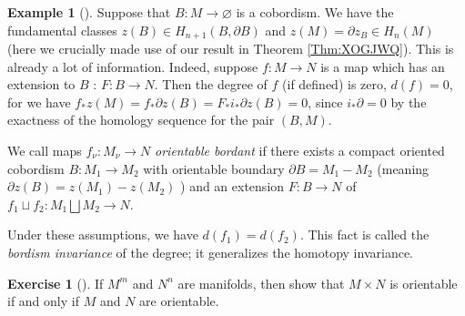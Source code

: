 \documentclass[reqno]{amsart}
\theoremstyle{definition}
\newtheorem{example}[theorem]{Example}
\newtheorem{exercise}[theorem]{Exercise}
\theoremstyle{remark}
\begin{document}
\begin{example}[]
    Suppose that
    $B \colon M \to \varnothing$ is a cobordism.
    We have the fundamental classes
    $z(B) \in H_{n+1}(B, \partial B)$ and
    $z(M) = \partial z_{B} \in 
    H_n (M)$ (here we crucially made use of our result
    in Theorem \ref{Thm:XOGJWQ}). This is already a lot of
    information. Indeed, suppose $f \colon M \to N$ is a 
    map which has an extension to $B$ : $F\colon B \to N$.
    Then the degree of $f$ (if defined) is zero,
    $d(f) = 0$, for we have
    $f_* z(M) = f_* \partial z(B) = 
    F_* i_* \partial z(B) = 0$, since
    $i_* \partial = 0$ by the exactness of the
    homology sequence for the pair
    $\left( B, M \right) $.

    We call maps $f_{\nu} \colon M_{\nu} \to N$ 
    \textit{orientable bordant} if there exists
    a compact oriented cobordism 
    $B \colon M_1 \to M_2$ with orientable
    boundary $\partial B = M_1 - M_2$ (meaning
    $\partial z(B) = z(M_1) - z(M_2)$ ) and an extension
    $F \colon B \to N$ of 
    $f_1 \sqcup  f_2 \colon M_1 \bigsqcup M_2 \to N$.

    Under these assumptions, we have
    $d(f_1) = d(f_2)$. This fact
    is called the \textit{bordism invariance} of the
    degree; it generalizes the homotopy invariance.
\end{example}

\begin{exercise}[]
    If $M^{m}$ and $N^{n}$ are manifolds, then show that
    $M \times N$ is orientable if and only if 
    $M$ and $N$ are orientable.
\end{exercise}
\end{document}
